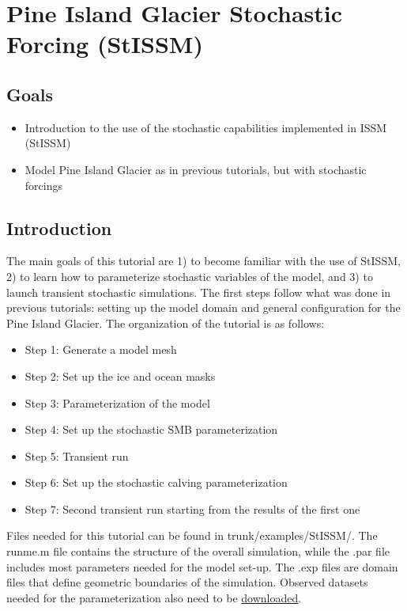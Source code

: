 \section{Pine Island Glacier Stochastic Forcing (StISSM)}
\subsection{Goals} %
\begin{itemize}
	\item Introduction to the use of the stochastic capabilities implemented in ISSM (StISSM)
	\item Model Pine Island Glacier as in previous tutorials, but with stochastic forcings
\end{itemize}

\subsection{Introduction}%
The main goals of this tutorial are 1) to become familiar with the use of StISSM, 2) to learn how to parameterize stochastic variables of the model, and 3) to launch transient stochastic simulations. The first steps follow what was done in previous tutorials: setting up the model domain and general configuration for the Pine Island Glacier. The organization of the tutorial is as follows:
\begin{itemize}
	\item Step 1: Generate a model mesh
	\item Step 2: Set up the ice and ocean masks
	\item Step 3: Parameterization of the model
	\item Step 4: Set up the stochastic SMB parameterization
	\item Step 5: Transient run
	\item Step 6: Set up the stochastic calving parameterization
	\item Step 7: Second transient run starting from the results of the first one
\end{itemize}
Files needed for this tutorial can be found in trunk/examples/StISSM/. The runme.m file contains the structure of the overall simulation, while the .par file includes most parameters needed for the model set-up. The .exp files are domain files that define geometric boundaries of the simulation. Observed datasets needed for the parameterization also need to be \href{https://issm.jpl.nasa.gov/documentation/tutorials/datasets/}{downloaded}. 

